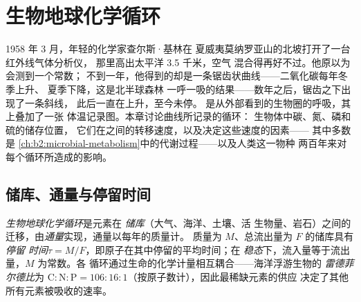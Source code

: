\chapter{生物地球化学循环}\label{ch:b2:biogeochemical-cycles}

1958 年 3 月，年轻的化学家查尔斯·基林在
夏威夷莫纳罗亚山的北坡打开了一台红外线气体分析仪，
那里高出太平洋 3.5 千米，空气
混合得再好不过。他原以为会测到一个常数；
不到一年，他得到的却是一条锯齿状曲线——二氧化碳每年冬季上升、
夏季下降，这是北半球森林
一呼一吸的结果——数年之后，锯齿之下出现了一条斜线，
此后一直在上升，至今未停。
是从外部看到的生物圈的呼吸，其上叠加了一张
体温记录图。本章讨论曲线所记录的循环：
生物体中碳、氮、磷和硫的储存位置，
它们在之间的转移速度，以及决定这些速度的因素——
其中多数是
\cref{ch:b2:microbial-metabolism}中的代谢过程——以及人类这一物种
两百年来对每个循环所造成的影响。

\section{储库、通量与停留时间}

\begin{definition}[储库、通量与停留时间]\label{def:b2:biogeochemical-cycles:reservoir}
\emph{生物地球化学循环}是元素在
\emph{储库}（大气、海洋、土壤、活
生物量、岩石）之间的迁移，由\emph{通量}实现，通量以每年的质量计。
质量为 $M$、总流出量为 $F$ 的储库具有\emph{停留
时间}$\tau = M/F$，即原子在其中停留的平均时间；在
\emph{稳态}下，流入量等于流出量，$M$ 为常数。各
循环通过生命的化学计量相互耦合——海洋浮游生物的
\emph{雷德菲尔德比}为 $\mathrm{C:N:P} =
106:16:1$（按原子数计），因此最稀缺元素的供应
决定了其他所有元素被吸收的速率。
\end{definition}

